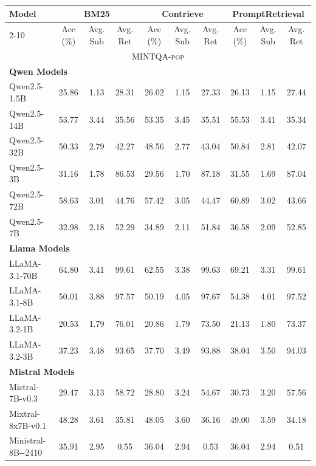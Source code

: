 \begin{table}[ht]
\centering
\tiny
\begin{tabular}{l|ccc|ccc|ccc}
\hline
\multirow{2}{*}{Model} & \multicolumn{3}{c|}{BM25} & \multicolumn{3}{c|}{Contrieve} & \multicolumn{3}{c}{PromptRetrieval} \\
\cline{2-10}
& Acc (\%) & Avg. Sub & Avg. Ret  & Acc (\%) & Avg. Sub  & Avg. Ret  & Acc (\%) & Avg. Sub  & Avg. Ret  \\
\hline
\multicolumn{10}{c}{\textsc{MINTQA-pop}} \\
\hline
\multicolumn{10}{l}{\textbf{Qwen Models}} \\
Qwen2.5\mbox{-}1.5B & 25.86 & 1.13 & 28.31 & 26.02 & 1.15 & 27.33 & 26.13 & 1.15 & 27.44 \\
Qwen2.5\mbox{-}14B & 53.77 & 3.44 & 35.56 & 53.35 & 3.45 & 35.51 & 55.53 & 3.41 & 35.34 \\
Qwen2.5\mbox{-}32B & 50.33 & 2.79 & 42.27 & 48.56 & 2.77 & 43.04 & 50.84 & 2.81 & 42.07 \\
Qwen2.5\mbox{-}3B & 31.16 & 1.78 & 86.53 & 29.56 & 1.70 & 87.18 & 31.55 & 1.69 & 87.04 \\
Qwen2.5\mbox{-}72B & 58.63 & 3.01 & 44.76 & 57.42 & 3.05 & 44.47 & 60.89 & 3.02 & 43.66 \\
Qwen2.5\mbox{-}7B & 32.98 & 2.18 & 52.29 & 34.89 & 2.11 & 51.84 & 36.58 & 2.09 & 52.85 \\
\hline
\multicolumn{10}{l}{\textbf{Llama Models}} \\
LLaMA\mbox{-}3.1\mbox{-}70B & 64.80 & 3.41 & 99.61 & 62.55 & 3.38 & 99.63 & 69.21 & 3.31 & 99.61 \\
LLaMA\mbox{-}3.1\mbox{-}8B & 50.01 & 3.88 & 97.57 & 50.19 & 4.05 & 97.67 & 54.38 & 4.01 & 97.52 \\
LLaMA\mbox{-}3.2\mbox{-}1B & 20.53 & 1.79 & 76.01 & 20.86 & 1.79 & 73.50 & 21.13 & 1.80 & 73.37 \\
LLaMA\mbox{-}3.2\mbox{-}3B& 37.23 & 3.48 & 93.65 & 37.70 & 3.49 & 93.88 & 38.04 & 3.50 & 94.03 \\
\hline
\multicolumn{10}{l}{\textbf{Mistral Models}} \\
Mistral\mbox{-}7B\mbox{-}v0.3 & 29.47 & 3.13 & 58.72 & 28.80 & 3.24 & 54.67 & 30.73 & 3.20 & 57.56 \\
Mixtral\mbox{-}8x7B\mbox{-}v0.1 & 48.28 & 3.61 & 35.81 & 48.05 & 3.60 & 36.16 & 49.00 & 3.59 & 34.18 \\
Ministral\mbox{-}8B\mbox{-}\mbox{-}2410 & 35.91 & 2.95 & 0.55 & 36.04 & 2.94 & 0.53 & 36.04 & 2.94 & 0.51 \\

\end{tabular}
\end{table}
